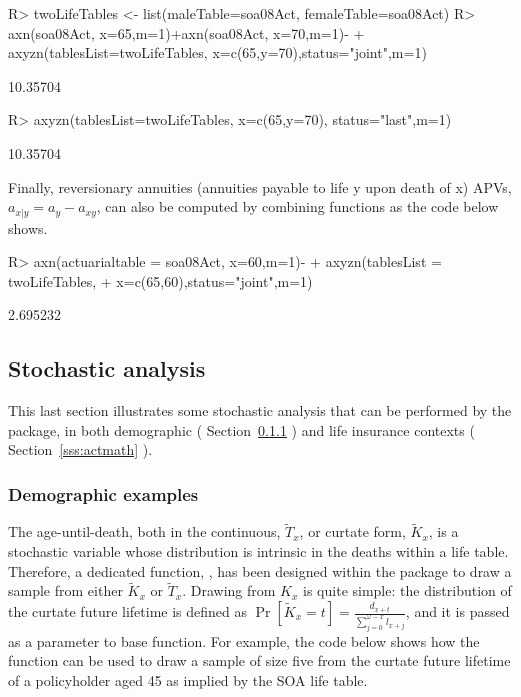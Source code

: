 \documentclass[nojss]{jss}
\begin{document}
\begin{Schunk}
\begin{Sinput}
R> twoLifeTables <- list(maleTable=soa08Act, femaleTable=soa08Act)
R> axn(soa08Act, x=65,m=1)+axn(soa08Act, x=70,m=1)-
+  axyzn(tablesList=twoLifeTables,	x=c(65,y=70),status="joint",m=1) 
\end{Sinput}
\begin{Soutput}
[1] 10.35704
\end{Soutput}
\begin{Sinput}
R> axyzn(tablesList=twoLifeTables, x=c(65,y=70), status="last",m=1)
\end{Sinput}
\begin{Soutput}
[1] 10.35704
\end{Soutput}
\end{Schunk}

Finally, reversionary annuities (annuities payable to life y upon death of x)
APVs, $a_{x|y}=a_{y} - a_{xy}$, can also be computed by combining
 functions as the code below shows.

\begin{Schunk}
\begin{Sinput}
R> axn(actuarialtable = soa08Act, x=60,m=1)-
+  		axyzn(tablesList = twoLifeTables, 
+  				x=c(65,60),status="joint",m=1)
\end{Sinput}
\begin{Soutput}
[1] 2.695232
\end{Soutput}
\end{Schunk}


\subsection{Stochastic analysis}\label{ss:stochastic}
This last section illustrates some stochastic analysis that can be performed by the 
 package, in both demographic (
Section~\ref{sss:demo} ) and life insurance contexts (
Section~\ref{sss:actmath} ).\\

\subsubsection{Demographic examples}\label{sss:demo}

The age-until-death, both in the continuous, $\tilde T_x$,  or curtate form, $\tilde K_x$, is a stochastic variable whose 
distribution is intrinsic in the deaths within a life table.  Therefore, a
dedicated function, , has been designed within
the  package to draw a sample from either  $\tilde K_x$ or $\tilde T_x$. Drawing from $K_x$ is quite simple: the distribution of the curtate future lifetime is defined as
$\Pr \left[ {{{\tilde K}_x} = t} \right] = \frac{{{d_{x + t}}}}{{\sum\limits_{j = 0}^{\omega  - x} {{l_{x + j}}} }}$, and it is passed as a
 parameter to base   function. For example,
the code below shows how the  function can be used to draw a sample of
size five from the curtate future lifetime of a policyholder aged 45 as implied by
the SOA life table.
\end{document}
